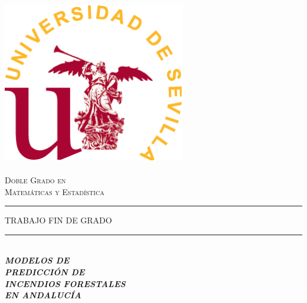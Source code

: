 \begin{titlepage}

\newcommand{\HRule}{\rule{\linewidth}{0.5mm}} %

\center %


\begin{minipage}{14cm}
\center

\includegraphics[width=8cm,height=8cm]{logo}\\[0.5cm] %


\textsc{\LARGE Doble Grado en \\[0.2cm]
Matemáticas y Estadística}\\[2.3cm] 



\rule[1.7mm]{2cm}{0.5mm}
\hfill
\textsc{\Large TRABAJO FIN DE GRADO} 
\hfill
\rule[1.7mm]{2cm}{0.5mm} 
\\[0.75cm]

{\Huge
\textbf{\textit{
MODELOS DE \\[0.2cm]
PREDICCIÓN DE \\[0.2cm] %
INCENDIOS FORESTALES \\[0.2cm]
EN ANDALUCÍA 
}}}\\[0.75cm] 


\end{minipage}
\end{titlepage}
